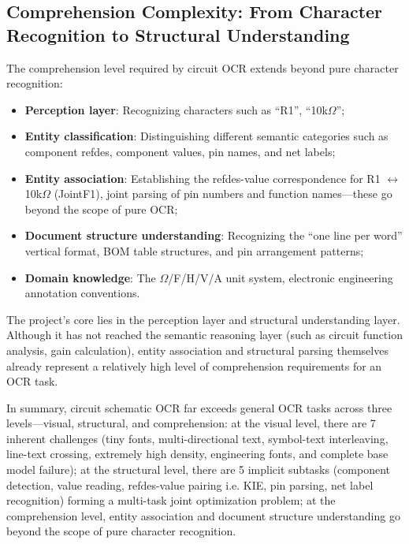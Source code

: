 \subsection{Comprehension Complexity: From Character Recognition to Structural Understanding}

The comprehension level required by circuit OCR extends beyond pure character recognition:

\begin{itemize}[nosep]
    \item \textbf{Perception layer}: Recognizing characters such as ``R1'', ``10k$\Omega$'';
    \item \textbf{Entity classification}: Distinguishing different semantic categories such as component refdes, component values, pin names, and net labels;
    \item \textbf{Entity association}: Establishing the refdes-value correspondence for R1 $\leftrightarrow$ 10k$\Omega$ (JointF1), joint parsing of pin numbers and function names---these go beyond the scope of pure OCR;
    \item \textbf{Document structure understanding}: Recognizing the ``one line per word'' vertical format, BOM table structures, and pin arrangement patterns;
    \item \textbf{Domain knowledge}: The $\Omega$/F/H/V/A unit system, electronic engineering annotation conventions.
\end{itemize}

The project's core lies in the perception layer and structural understanding layer. Although it has not reached the semantic reasoning layer (such as circuit function analysis, gain calculation), entity association and structural parsing themselves already represent a relatively high level of comprehension requirements for an OCR task.

In summary, circuit schematic OCR far exceeds general OCR tasks across three levels---visual, structural, and comprehension: at the visual level, there are 7 inherent challenges (tiny fonts, multi-directional text, symbol-text interleaving, line-text crossing, extremely high density, engineering fonts, and complete base model failure); at the structural level, there are 5 implicit subtasks (component detection, value reading, refdes-value pairing i.e. KIE, pin parsing, net label recognition) forming a multi-task joint optimization problem; at the comprehension level, entity association and document structure understanding go beyond the scope of pure character recognition.

